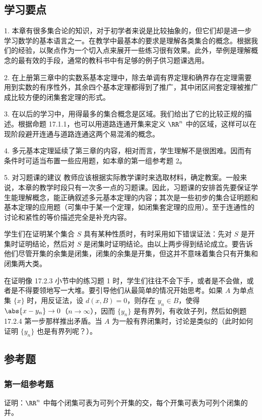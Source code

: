 \subsection{学习要点}

1. 本章有很多集合论的知识，对于初学者来说是比较抽象的，但它们却是进一步学习数学的基本语言之一。在教学中最基本的要求是理解各类集合的概念。根据我们的经验，以聚点作为一个切入点来展开一些练习很有效果。此外，举例是理解概念的最有效的手段，通常的教科书中有足够的例子供习题课选用。

2. 在上册第三章中的实数系基本定理中，除去单调有界定理和确界存在定理需要用到实数的有序性外，其余四个基本定理都得到了推广，其中闭区间套定理被推广成比较方便的闭集套定理的形式。

3. 在以后的学习中，用得最多的集合概念是区域。我们给出了它的比较正规的描述。根据命题 17.1.1，也可以用道路连通开集来定义 $\RR^n$ 中的区域，这样可以在现阶段避开连通与道路连通这两个易混淆的概念。

4. 多元基本定理延续了第三章的内容，相对而言，学生理解不是很困难。因而有条件时可适当布置一些应用题，如本章的第一组参考题 2。

5. 对习题课的建议 教师应该根据实际教学课时来选取材料，确定教案。一般来说，本章的教学时段只有一次多一点的习题课。因此，习题课的安排首先要保证学生能理解概念，能正确叙述多元基本定理的内容；其次是一些初步的集合证明题和基本定理的应用题（可集中于某一个定理，如闭集套定理的应用）。至于连通性的讨论和紧性的等价描述完全是补充内容。

学生们在证明某个集合 $S$ 具有某种性质时，有时采用如下错误证法：先对 $S$ 是开集时证明结论，然后对 $S$ 是闭集时证明结论。由以上两步得到结论成立。要告诉他们尽管开集的余集是闭集，闭集的余集是开集，但这并不意味着集合只有开集和闭集两大类。

在证明像 17.2.3 小节中的练习题 1 时，学生们往往不会下手，或者是不会做，或者是不得要领地写一大堆。要引导他们从最简单的情况开始思考。如果 $A$ 为单点集 $\{x\}$ 时，用反证法，设 $d(x,B)=0$，则存在 $y_n\in B$，使得 $\abs{x-y_n}\to0$（$n\to\infty$），因而 $\{y_n\}$ 是有界列，有收敛子列，然后如例题 17.2.4 第一步那样推出矛盾。当 $A$ 为一般有界闭集时，讨论是类似的（此时如何证明 $\{y_n\}$ 也是有界列呢？）。

\subsection{参考题}

\subsubsection*{第一组参考题}
\begin{xreferenceproblem}[1]
证明：$\RR^n$ 中每个闭集可表为可列个开集的交，每个开集可表为可列个闭集的并。
\end{xreferenceproblem}

